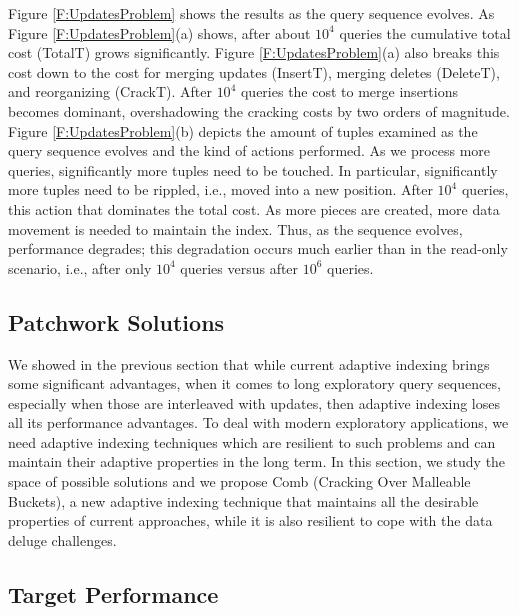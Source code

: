 \documentclass{sig-alternate}
\begin{document}
Figure \ref{F:UpdatesProblem} shows the results as the query sequence evolves. As Figure \ref{F:UpdatesProblem}(a) shows, after about $10^4$ queries the cumulative total cost (TotalT) grows significantly. Figure \ref{F:UpdatesProblem}(a) also breaks this cost down to the cost for merging updates (InsertT), merging deletes (DeleteT), and reorganizing (CrackT). After $10^4$ queries the cost to merge insertions becomes dominant, overshadowing the cracking costs by two orders of magnitude. Figure \ref{F:UpdatesProblem}(b) depicts the amount of tuples examined as the query sequence evolves and the kind of actions performed. As we process more queries, significantly more tuples need to be touched. In particular, significantly more tuples need to be rippled, i.e., moved into a new position. After $10^4$ queries, this action that dominates the total cost. As more pieces are created, more data movement is needed to maintain the index. Thus, as the sequence evolves, performance degrades; this degradation occurs much earlier than in the read-only scenario, i.e., after only $10^4$ queries versus after $10^6$ queries.



\subsection{Patchwork Solutions}\label{sec:patches}

We showed in the previous section that while current adaptive indexing brings some significant advantages,
when it comes to long exploratory query sequences, especially when those are interleaved with updates,
then adaptive indexing loses all its performance advantages.
To deal with modern exploratory applications, we need adaptive indexing techniques which are resilient
to such problems and can maintain their adaptive properties in the long term.
In this section, we study the space of possible solutions and we propose Comb (Cracking Over Malleable Buckets), a new
adaptive indexing technique that maintains all the desirable properties of current approaches,
while it is also resilient to cope with the data deluge challenges.


\subsection{Target Performance}
\end{document}
